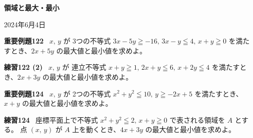 \documentclass[12pt]{ltjsarticle}
\begin{document}
{\LARGE%
\noindent
\textbf{%
領域と最大・最小
}}

\begin{flushleft}
2024年6月4日 \\
\end{flushleft}

\noindent
\textbf{重要例題122}~
$x,\, y$ が 3つの不等式 $3x-5y \geqq -16,\, 3x-y \leqq 4,\, x+y \geqq 0$ を満たすとき、$2x+5y$ の最大値と最小値を求めよ。


\newpage

\noindent
\textbf{練習122 (2)}~
$x,\, y$ が 連立不等式 $x+y \geqq 1,\, 2x+y \leqq 6,\, x+2y \leqq 4$ を満たすとき、$2x+3y$ の最大値と最小値を求めよ。

\newpage

\noindent
\textbf{重要例題124}~
$x,\, y$ が 2つの不等式 $x^2 + y^2 \leqq 10,\, y \geqq -2x + 5$ を満たすとき、$x+y$ の最大値と最小値を求めよ。

\newpage

\noindent
\textbf{練習124}~
座標平面上で不等式 $x^2 + y^2 \leqq 2,\, x+y \geqq 0$ で表される領域を $A$ とする。
点 $(x,\,y)$ が $A$ 上を動くとき、$4x+3y$ の最大値と最小値を求めよ。
\end{document}
